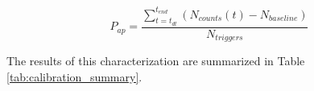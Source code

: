 \begin{equation}
    P_{ap} = \frac{\sum_{t = t_{dt}}^{t_{end}} (N_{counts}(t) - N_{baseline})}{N_{triggers}}
\end{equation}

The results of this characterization are summarized in Table \ref{tab:calibration_summary}.

\begin{table}[htpb]
    \centering
    \caption{Summary of Detector Calibration Parameters}
    \label{tab:calibration_summary}
\end{table}
